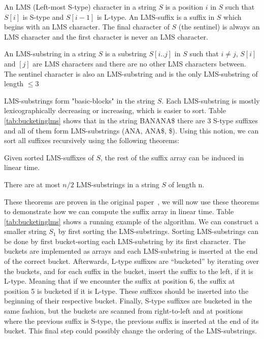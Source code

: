 \begin{definition}

    An LMS (Left-most S-type) character in a string $S$ is a position $i$ in $S$ such that
    $S[i]$ is S-type and $S[i-1]$ is L-type. An LMS-suffix is a suffix in $S$ which begins
    with an LMS character. The final character of $S$ (the sentinel) is always an LMS
    character and the first character is never an LMS character.

\end{definition}

\begin{definition}

    An LMS-substring in a string $S$ is a substring $S[i..j]$ in $S$ such that $i \neq j$,
    $S[i]$ and $[j]$ are LMS characters and there are no other LMS characters between. The
    sentinel character is also an LMS-substring and is the only LMS-substring of length
    $\leq 3$

\end{definition}

LMS-substrings form "basic-blocks" in the string $S$. Each LMS-substring is mostly
lexicographically decreasing or increasing, which is easier to sort. Table
\ref{tab:bucketinglms} shows that in the string BANANA\$ there are 3 S-type suffixes
and all of them form LMS-substrings (ANA, ANA\$, \$). Using this notion, we can sort all
suffixes recursively using the following theorems:

\begin{theorem}

    Given sorted LMS-suffixes of $S$, the rest of the suffix array can be induced in linear
    time. 

\end{theorem}

\begin{theorem}
    There are at most $n / 2$ LMS-substrings in a string $S$ of length n.
\end{theorem}

These theorems are proven in the original paper~\cite{LinearTimeSuffixArraySAIS}, we will
now use these theorems to demonstrate how we can compute the suffix array in linear time.
Table \ref{tab:bucketinglms} shows a running example of the algorithm. We can construct a
smaller string $S_1$ by first sorting the LMS-substrings. Sorting LMS-substrings can be
done by first bucket-sorting each LMS-substring by its first character. The buckets are
implemented as arrays and each LMS-substring is inserted at the end of the correct bucket.
Afterwards, L-type suffixes are ``bucketed'' by iterating over the buckets, and for each
suffix in the bucket, insert the suffix to the left, if it is L-type. Meaning that if we
encounter the suffix at position 6, the suffix at position 5 is bucketed if it is L-type.
These suffixes should be inserted into the beginning of their respective bucket. Finally,
S-type suffixes are bucketed in the same fashion, but the buckets are scanned from
right-to-left and at positions where the previous suffix is S-type, the previous suffix is
inserted at the end of its bucket. This final step could possibly change the ordering of
the LMS-substrings.

